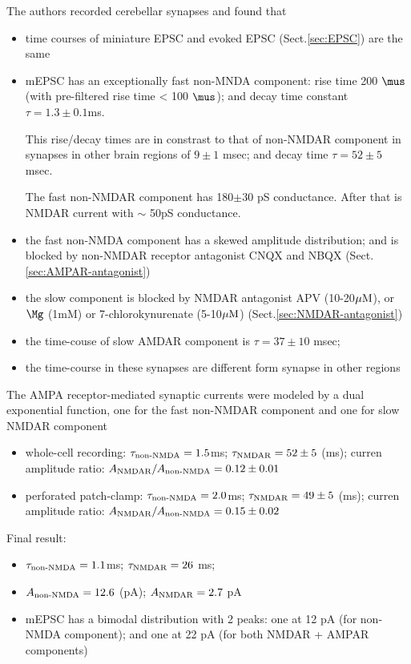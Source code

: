 The authors \citep{silver1992} recorded cerebellar synapses and found that
\begin{itemize}
  \item time courses of miniature EPSC and evoked EPSC (Sect.\ref{sec:EPSC}) are
  the same
  
  \item mEPSC has an exceptionally fast non-MNDA component: rise time 200 $\mus$
  (with pre-filtered rise time < 100 $\mus$); and decay time constant
  $\tau=1.3\pm 0.1$ms.
  
This rise/decay times are in constrast to that of non-NMDAR component in
synapses in other brain regions of $9\pm 1$ msec; and decay time $\tau = 52\pm 5$ msec.
  
The fast non-NMDAR component has 180$\pm$30 pS conductance. 
After that is NMDAR current with $\sim$ 50pS  conductance.

  \item the fast non-NMDA component has a skewed amplitude distribution; and is
  blocked by non-NMDAR receptor antagonist CNQX and NBQX
  (Sect.\ref{sec:AMPAR-antagonist})
  
  \item the slow component is blocked by NMDAR antagonist APV (10-20${\mu\text{M}}$), or
  $\Mg$ (1mM) or 7-chlorokynurenate (5-10${\mu\text{M}}$)
  (Sect.\ref{sec:NMDAR-antagonist})
  
  \item the time-couse of slow AMDAR component is $\tau = 37\pm 10$ msec;
  
  
  \item the time-course in these synapses are different form synapse in other
  regions
  
\end{itemize}


The AMPA receptor-mediated synaptic currents were modeled by a dual exponential
function, one for the fast non-NMDAR component and one for slow NMDAR component
\begin{itemize}
  \item whole-cell recording: $\tau_{\text{non-NMDA}} = 1.5$ms; $\tau_{\text{NMDAR}} = 52\pm 5$
  (ms); curren amplitude ratio: $A_{\text{NMDAR}}/A_{\text{non-NMDA}} = 0.12 \pm0.01$
  
  \item perforated patch-clamp: $\tau_{\text{non-NMDA}} = 2.0$ms; $\tau_{\text{NMDAR}} = 49\pm 5$
  (ms); curren amplitude ratio: $A_{\text{NMDAR}}/A_{\text{non-NMDA}} = 0.15 \pm0.02$
\end{itemize}

Final result:
\begin{itemize}
  \item $\tau_{\text{non-NMDA}} = 1.1 $ms; $\tau_{\text{NMDAR}} = 26$ ms;
  
  \item $A_{\text{non-NMDA}} = 12.6$ (pA); $A_{\text{NMDAR}} = 2.7$ pA
  
  \item mEPSC has a bimodal distribution with 2 peaks: one at 12 pA (for
  non-NMDA component); and one at 22 pA (for both NMDAR + AMPAR components)
\end{itemize}

